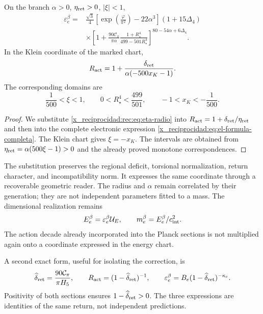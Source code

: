 \begin{corollary}
\label{x_reciprocidad:rec:cor:electron}
On the branch \(\alpha>0\), \(\eta_{\rm ret}>0\), \(|\xi|<1\),
\begin{align}
 \varepsilon_e^{\beta}={}&
 \frac{\sqrt3}{4}
 \left[\exp\!\left(\frac\varphi{\pi^2}\right)-22\alpha^3\right]
 (1+15\Delta_4)\nonumber\\
 &\times\left[1+\frac{90\mathcal C_\pi}{\pi\alpha}
 \frac{1+R_\star^4}{499-501R_\star^4}\right]^{80-54\alpha+6\Delta_4}.
 \label{x_reciprocidad:rec:eq:electron-radio}
\end{align}
In the Klein coordinate of the marked chart,
\begin{equation}
 R_{\rm act}=1+
 \frac{\delta_{\rm ret}}{\alpha(-500x_K-1)}.
 \label{x_reciprocidad:rec:eq:accion-klein}
\end{equation}
The corresponding domains are
\[
 \frac1{500}<\xi<1,\qquad
 0<R_\star^4<\frac{499}{501},\qquad
 -1<x_K<-\frac1{500}.
\]
\end{corollary}
\begin{proof}
We substitute \eqref{x_reciprocidad:rec:eq:eta-radio} into \(R_{\rm act}=1+\delta_{\rm ret}/\eta_{\rm ret}\) and then into the complete electronic expression \eqref{x_reciprocidad:eq:el-formula-completa}. The Klein chart gives \(\xi=-x_K\). The intervals are obtained from \(\eta_{\rm ret}=\alpha(500\xi-1)>0\) and the already proved monotone correspondences.
\end{proof}

The substitution preserves the regional deficit, torsional normalization, return character, and incompatibility norm. It expresses the same coordinate through a recoverable geometric reader. The radius and \(\alpha\) remain correlated by their generation; they are not independent parameters fitted to a mass. The dimensional realization remains
\[
 E_e^{\beta}=\varepsilon_e^{\beta}\mathcal U_E,\qquad
 m_e^{\beta}=E_e^{\beta}/c_{\rm int}^2.
\]
The action decade already incorporated into the Planck sections is not multiplied again onto a coordinate expressed in the energy chart.

A second exact form, useful for isolating the correction, is
\[
 \widehat\delta_{\rm ret}=\frac{90\mathcal C_\pi}{\pi H_5},\qquad
 R_{\rm act}=(1-\widehat\delta_{\rm ret})^{-1},\qquad
 \varepsilon_e^{\beta}=B_e(1-\widehat\delta_{\rm ret})^{-\kappa_e}.
\]
Positivity of both sections ensures \(1-\widehat\delta_{\rm ret}>0\). The three expressions are identities of the same return, not independent predictions.


